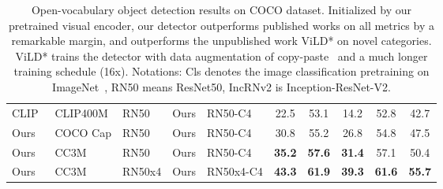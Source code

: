 \begin{table*}[]
{\begin{tabular}{lll|ll|ccccc}
CLIP~\cite{radford2021learning} & CLIP400M & RN50 & Ours & RN50-C4 & \multicolumn{1}{c}{22.5} & \multicolumn{1}{c}{53.1} & 14.2 & 52.8 & 42.7 \\
Ours & COCO Cap & RN50 & Ours & RN50-C4 & \multicolumn{1}{c}{30.8} & \multicolumn{1}{c}{55.2} & 26.8 & 54.8 & 47.5 \\
Ours & CC3M & RN50 & Ours & RN50-C4 & \multicolumn{1}{c}{\textbf{35.2}} & \multicolumn{1}{c}{\textbf{57.6}} & \textbf{31.4} & 57.1 & 50.4 \\ \midrule
Ours & CC3M & RN50x4 & Ours & RN50x4-C4 & \multicolumn{1}{c}{\textbf{43.3}} & \multicolumn{1}{c}{\textbf{61.9}} & \textbf{39.3} & \textbf{61.6} & \textbf{55.7} \\ \bottomrule
\end{tabular}} \vspace{-2mm}
\caption{Open-vocabulary object detection results on COCO dataset. Initialized by our pretrained visual encoder, our detector outperforms published works on all metrics by a remarkable margin, and outperforms the unpublished work ViLD* on novel categories. ViLD* trains the detector with data augmentation of copy-paste~\cite{ghiasi2021simple} and a much longer training schedule (16x). Notations: Cls denotes the image classification pretraining on ImageNet~\cite{imagenet}, RN50 means ResNet50, IncRNv2 is Inception-ResNet-V2.}
\label{tab:zeroshot-main}
\end{table*}


